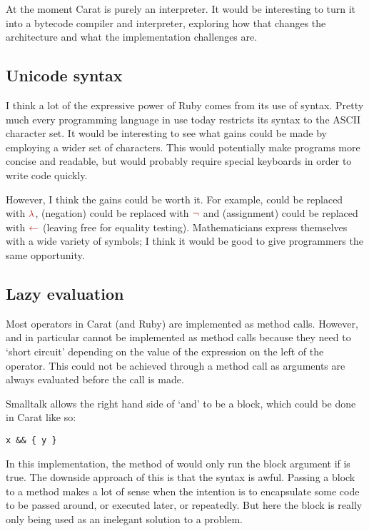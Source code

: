 At the moment Carat is purely an interpreter. It would be interesting to turn it into a bytecode compiler and interpreter, exploring how that changes the architecture and what the implementation challenges are.

\subsection{Unicode syntax}

I think a lot of the expressive power of Ruby comes from its use of syntax. Pretty much every programming language in use today restricts its syntax to the ASCII character set. It would be interesting to see what gains could be made by employing a wider set of characters. This would potentially make programs more concise and readable, but would probably require special keyboards in order to write code quickly.

However, I think the gains could be worth it. For example,  could be replaced with $\color{Mahogany} \lambda$, \code{!} (negation) could be replaced with $\color{Mahogany} \neg$ and \code{=} (assignment) could be replaced with $\color{Mahogany} \leftarrow$ (leaving \code{=} free for equality testing). Mathematicians express themselves with a wide variety of symbols; I think it would be good to give programmers the same opportunity.

\subsection{Lazy evaluation}

Most operators in Carat (and Ruby) are implemented as method calls. However, \code{&&} and \code{||} in particular cannot be implemented as method calls because they need to `short circuit' depending on the value of the expression on the left of the operator. This could not be achieved through a method call as arguments are always evaluated before the call is made.

Smalltalk allows the right hand side of `and' to be a block, which could be done in Carat like so:

\begin{lstlisting}
x && { y }
\end{lstlisting}

In this implementation, the \code{&&} method of  would only run the block argument if  is true. The downside approach of this is that the syntax is awful. Passing a block to a method makes a lot of sense when the intention is to encapsulate some code to be passed around, or executed later, or repeatedly. But here the block is really only being used as an inelegant solution to a problem.

